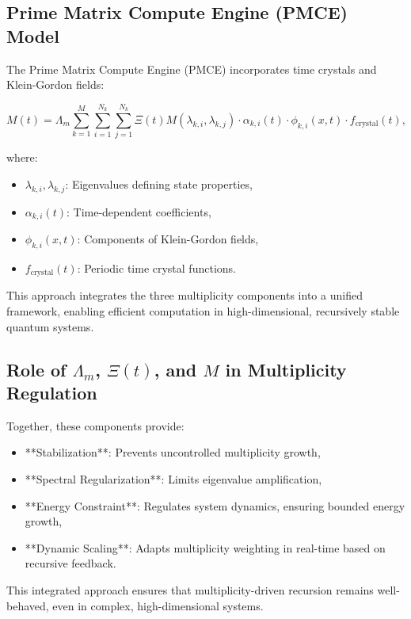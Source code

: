 \documentclass{article}
\theoremstyle{plain}
\begin{document}
\subsection{Prime Matrix Compute Engine (PMCE) Model}

The Prime Matrix Compute Engine (PMCE) incorporates time crystals and Klein-Gordon fields:

\begin{equation}
M(t) = \Lambda_m \sum_{k=1}^M \sum_{i=1}^{N_k} \sum_{j=1}^{N_k} \Xi(t) M(\lambda_{k,i}, \lambda_{k,j}) \cdot \alpha_{k,i}(t) \cdot \phi_{k,i}(x,t) \cdot f_{\text{crystal}}(t),
\end{equation}

where:
\begin{itemize}
    \item \( \lambda_{k,i}, \lambda_{k,j} \): Eigenvalues defining state properties,
    \item \( \alpha_{k,i}(t) \): Time-dependent coefficients,
    \item \( \phi_{k,i}(x,t) \): Components of Klein-Gordon fields,
    \item \( f_{\text{crystal}}(t) \): Periodic time crystal functions.
\end{itemize}

This approach integrates the three multiplicity components into a unified framework, enabling efficient computation in high-dimensional, recursively stable quantum systems.

\subsection{Role of \(\Lambda_m\), \(\Xi(t)\), and \(M\) in Multiplicity Regulation}

Together, these components provide:

\begin{itemize}
    \item **Stabilization**: Prevents uncontrolled multiplicity growth,
    \item **Spectral Regularization**: Limits eigenvalue amplification,
    \item **Energy Constraint**: Regulates system dynamics, ensuring bounded energy growth,
    \item **Dynamic Scaling**: Adapts multiplicity weighting in real-time based on recursive feedback.
\end{itemize}

This integrated approach ensures that multiplicity-driven recursion remains well-behaved, even in complex, high-dimensional systems.
\end{document}
